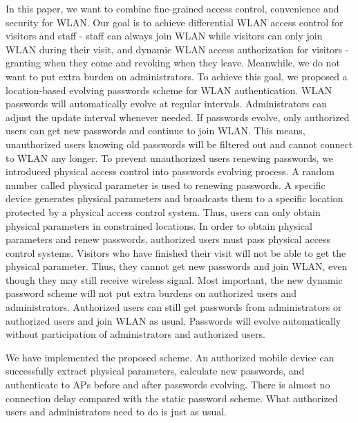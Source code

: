 In this paper, we want to combine fine-grained access control, convenience and security for WLAN. Our goal is to achieve differential WLAN access control for visitors and staff - staff can always join WLAN while visitors can only join WLAN during their visit, and dynamic WLAN access authorization for visitors - granting when they come and revoking when they leave. Meanwhile, we do not want to put extra burden on administrators. To achieve this goal, we proposed a location-based evolving passwords scheme for WLAN authentication. WLAN passwords will automatically evolve at regular intervals. Administrators can adjust the update interval whenever needed. If passwords evolve, only authorized users can get new passwords and continue to join WLAN. This means, unauthorized users knowing old passwords will be filtered out and cannot connect to WLAN any longer. To prevent unauthorized users renewing passwords, we introduced physical access control into passwords evolving process. A random number called physical parameter is used to renewing passwords. A specific device generates physical parameters and broadcasts them to a specific location protected by a physical access control system. Thus, users can only obtain physical parameters in constrained locations. In order to obtain physical parameters and renew passwords, authorized users must pass physical access control systems. Visitors who have finished their visit will not be able to get the physical parameter. Thus, they cannot get new passwords and join WLAN, even though they may still receive wireless signal. Most important, the new dynamic password scheme will not put extra burdens on authorized users and administrators. Authorized users can still get passwords from administrators or authorized users and join WLAN as usual. Passwords will evolve automatically without participation of administrators and authorized users. 


We have implemented the proposed scheme. An authorized mobile device can successfully extract physical parameters, calculate new passwords, and authenticate to APs before and after passwords evolving. There is almost no connection delay compared with the static password scheme. What authorized users and administrators need to do is just as usual. 


